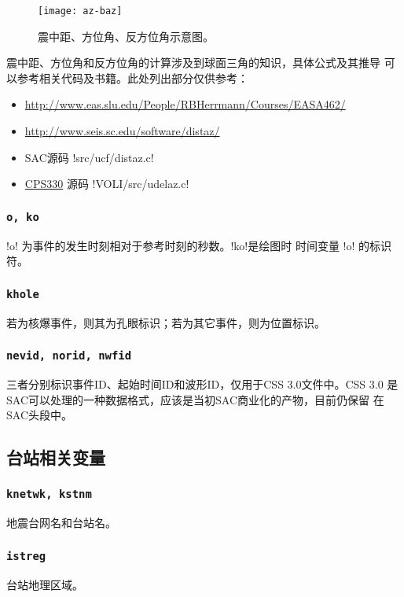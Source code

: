 \begin{figure}[H]
\centering
\texttt{[image: az-baz]}
\caption[震中距、方位角、反方位角示意图]{震中距、方位角、反方位角示意图。}
\label{fig:gcarc-dist-az-baz}
\end{figure}

震中距、方位角和反方位角的计算涉及到球面三角的知识，具体公式及其推导
可以参考相关代码及书籍。此处列出部分仅供参考：
\begin{itemize}
\item \url{http://www.eas.slu.edu/People/RBHerrmann/Courses/EASA462/}
\item \url{http://www.seis.sc.edu/software/distaz/}
\item SAC源码 !src/ucf/distaz.c!
\item \href{http://www.eas.slu.edu/eqc/eqccps.html}{CPS330} 源码 !VOLI/src/udelaz.c!
\end{itemize}

\subsubsection{\texttt{o, ko}}
!o! 为事件的发生时刻相对于参考时刻的秒数。!ko!是绘图时
时间变量 !o! 的标识符。

\subsubsection{\texttt{khole}}
若为核爆事件，则其为孔眼标识；若为其它事件，则为位置标识。

\subsubsection{\texttt{nevid, norid, nwfid}}
三者分别标识事件ID、起始时间ID和波形ID，仅用于CSS 3.0文件中。CSS 3.0
是SAC可以处理的一种数据格式，应该是当初SAC商业化的产物，目前仍保留
在SAC头段中。

\subsection{台站相关变量}
\subsubsection{\texttt{knetwk, kstnm}}
地震台网名和台站名。

\subsubsection{\texttt{istreg}\dag}
台站地理区域。

